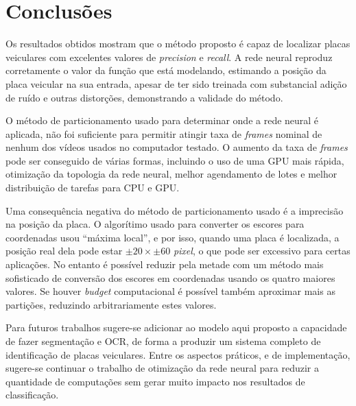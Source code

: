 
\chapter{Conclusões}

Os resultados obtidos mostram que o método proposto é capaz de localizar placas
veiculares com excelentes valores de \emph{precision} e \emph{recall}.  
A rede neural reproduz corretamente o valor da função
que está modelando, estimando a posição da placa veicular na sua
entrada, apesar de ter sido treinada com substancial adição de ruído e outras
distorções, demonstrando a validade do método.

O método de particionamento usado para determinar onde a rede neural é
aplicada, não foi suficiente para permitir atingir taxa de \emph{frames}
nominal de nenhum dos vídeos usados no computador testado. O aumento da
taxa de \emph{frames}
pode ser conseguido de várias formas, incluindo o uso de uma GPU mais rápida,
otimização da topologia da rede neural, melhor agendamento de lotes e melhor
distribuição de tarefas para CPU e GPU.

Uma consequência negativa do método de particionamento usado
é a imprecisão na
posição da placa. O algorítimo usado para converter os escores para coordenadas
usou ``máxima local'', e por isso, quando uma placa é localizada, a posição real
dela pode estar $\pm 20 \times \pm 60$ \emph{pixel}, o que pode ser excessivo
para
certas aplicações. No entanto é possível reduzir pela metade com um método mais
sofisticado de conversão dos escores em coordenadas usando os quatro maiores
valores. Se houver \emph{budget} computacional é possível também
aproximar mais as partições, reduzindo arbitrariamente estes valores.

Para futuros trabalhos sugere-se adicionar ao modelo aqui proposto a
capacidade de fazer segmentação e OCR, de forma a produzir um sistema completo
de identificação de placas veiculares. Entre os aspectos práticos, e de
implementação, sugere-se continuar o trabalho de otimização da rede
neural para reduzir a quantidade de computações sem gerar muito impacto nos
resultados de classificação.
